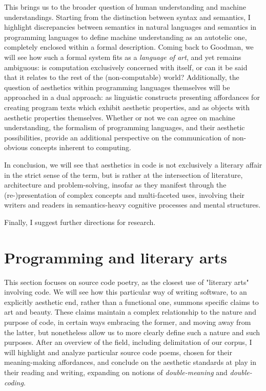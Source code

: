 \documentclass{article}
\begin{document}
This brings us to the broader question of human understanding and machine understandings. Starting from the distinction between syntax and semantics, I highlight discrepancies between semantics in natural languages and semantics in programming languages to define machine understanding as an autotelic one, completely enclosed within a formal description. Coming back to Goodman, we will see how such a formal system fits as a \emph{language of art}, and yet remains ambiguous: is computation exclusively concerned with itself, or can it be said that it relates to the rest of the (non-computable) world? Additionally, the question of aesthetics within programming languages themselves will be approached in a dual approach: as linguistic constructs presenting affordances for creating program texts which exhibit aesthetic properties, and as objects with aesthetic properties themselves. Whether or not we can agree on machine understanding, the formalism of programming languages, and their aesthetic possibilities, provide an additional perspective on the communication of non-obvious concepts inherent to computing.

In conclusion, we will see that aesthetics in code is not exclusively a literary affair in the strict sense of the term, but is rather at the intersection of literature, architecture and problem-solving, insofar as they manifest through the (re-)presentation of complex concepts and multi-faceted uses, involving their writers and readers in semantics-heavy cognitive processes and mental structures.

Finally, I suggest further directions for research.

\section{Programming and literary arts}

This section focuses on source code poetry, as the closest use of "literary arts" involving code. We will see how this particular way of writing software, to an explicitly aesthetic end, rather than a functional one, summons specific claims to art and beauty. These claims maintain a complex relationship to the nature and purpose of code, in certain ways embracing the former, and moving away from the latter, but nonetheless allow us to more clearly define such a nature and such purposes. After an overview of the field, including delimitation of our corpus, I will highlight and analyze particular source code poems, chosen for their meaning-making affordances, and conclude on the aesthetic standards at play in their reading and writing, expanding on notions of \emph{double-meaning} and \emph{double-coding}.
\end{document}
